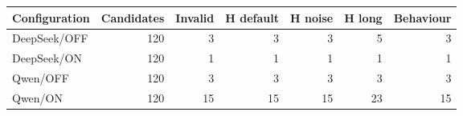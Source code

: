 \begin{tabular}{lrrrrrr}
\toprule
Configuration & Candidates & Invalid & H default & H noise & H long & Behaviour \\
\midrule
DeepSeek/OFF & 120 & 3 & 3 & 3 & 5 & 3 \\
DeepSeek/ON & 120 & 1 & 1 & 1 & 1 & 1 \\
Qwen/OFF & 120 & 3 & 3 & 3 & 3 & 3 \\
Qwen/ON & 120 & 15 & 15 & 15 & 23 & 15 \\
\bottomrule
\end{tabular}
